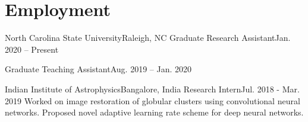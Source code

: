 \section{Employment}
  \resumeSubHeadingListStart

    \resumeSubheading
      {North Carolina State University}{Raleigh, NC}
      {Graduate Research Assistant}{Jan. 2020 -- Present}
      \resumeItemListStart
      \resumeItemListEnd
      
    \addExtraPosition
      {Graduate Teaching Assistant}{Aug. 2019 -- Jan. 2020}
      \resumeItemListStart
      \resumeItemListEnd

    \resumeSubheading
      {Indian Institute of Astrophysics}{Bangalore, India}
      {Research Intern}{Jul. 2018 - Mar. 2019}
      \resumeItemListStart
          {Worked on image restoration of globular clusters using convolutional neural networks.}
          {Proposed novel adaptive learning rate scheme for deep neural networks.}
      \resumeItemListEnd
      
  \resumeSubHeadingListEnd
